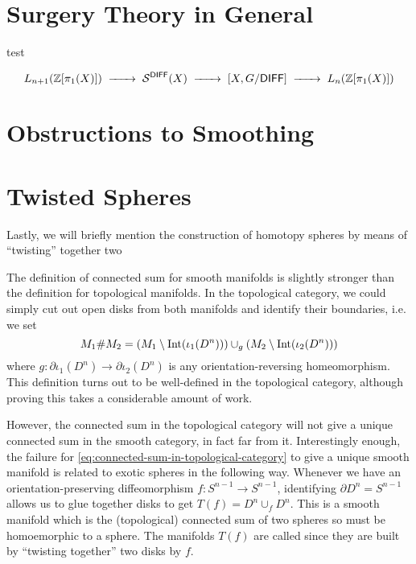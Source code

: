 
\section{Surgery Theory in General}\label{sec:surgery-theory-in-general}

\begin{theorem}[$s$-cobordism]
  test
\end{theorem}

\[
	L_{n+1}(\Z[\pi_1(X)]) \lkxto \mathcal{S}^\DIFF(X) \lkxto {[X, G/\DIFF]} \lkxto L_n(\Z[\pi_1(X)])
\]

\section{Obstructions to Smoothing}\label{sec:smoothing-obstructions}

\begin{theorem}[Freedman, 1982]\label{thm:freedman-actual}
\end{theorem}

\section{Twisted Spheres}\label{sec:twisted-spheres}
Lastly, we will briefly mention the construction of homotopy spheres by means of ``twisting'' together two 


	The definition of connected sum for smooth manifolds is slightly stronger than the definition for topological manifolds. In the topological category, we could simply cut out open disks from both manifolds and identify their boundaries, i.e. we set
	\begin{equation}\label{eq:connected-sum-in-topological-category}
		M_1\# M_2 = (M_1\setminus \operatorname{Int}(\iota_1(D^n)))\cup_g (M_2\setminus \operatorname{Int}(\iota_2(D^n)))
	\end{equation}
	where $g : \partial \iota_1(D^n) \to \partial \iota_2(D^n)$ is any orientation-reversing homeomorphism. This definition turns out to be well-defined in the topological category, although proving this takes a considerable amount of work. 

	However, the connected sum in the topological category will not give a unique connected sum in the smooth category, in fact far from it. Interestingly enough, the failure for \cref{eq:connected-sum-in-topological-category} to give a unique smooth manifold is related to exotic spheres in the following way. Whenever we have an orientation-preserving diffeomorphism $f: S^{n-1}\to S^{n-1}$, identifying $\partial D^n = S^{n-1}$ allows us to glue together disks to get $T(f)=D^n\cup_f D^n$. This is a smooth manifold which is the (topological) connected sum of two spheres so must be homoemorphic to a sphere. The manifolds $T(f)$ are called  since they are built by ``twisting together'' two disks by $f$. 

